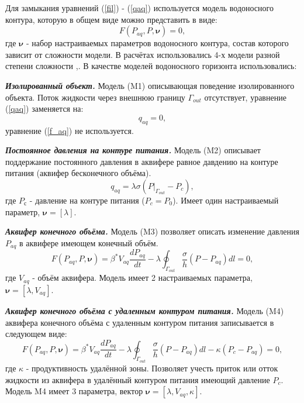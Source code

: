 \documentclass{article}
\begin{document}
Для замыкания уравнений (\ref{fil}) - (\ref{qaq}) используется модель водоносного контура, которую в общем виде можно представить в виде: 
\begin{equation} \label{f_aq}
F(P_{aq}, P,\boldsymbol{\nu})=0,
\end{equation}
где $\boldsymbol{\nu}$ - набор настраиваемых параметров водоносного контура, состав которого зависит от сложности модели. В расчётах использовались 4-х модели разной степени сложности \cite{dake},\cite{fet}. В качестве моделей водоносного горизонта использовались:

\textbf{\textit{Изолированный объект.}}
Модель (M1) описывающая поведение изолированного объекта. Поток жидкости через внешнюю границу $\Gamma_{out}$ отсутствует, уравнение (\ref{qaq}) заменяется на:
\begin{equation}
q_{aq}=0,
\end{equation}
уравнение (\ref{f_aq}) не используется.

\textbf{\textit{Постоянное давления на контуре питания.}}
Модель (M2) описывает поддержание постоянного давления в аквифере равное давдению на контуре питания (аквифер бесконечного объёма). 
\begin{equation}
q_{aq} = \lambda\sigma(P|_{\Gamma_{out}}-P_c),
\end{equation}
где $P_с$ - давление на контуре питания ($P_c = P_0$). Имеет один настраиваемый параметр, $\boldsymbol{\nu} = [\lambda]$.

\textbf{\textit{Аквифер конечного объёма.}}
Модель (M3) позволяет описать изменение давления $P_{aq}$ в аквифере имеющем конечный объём. 
\begin{equation}
F(P_{aq}, P,\boldsymbol{\nu})=\beta^*V_{aq}\frac{dP_{aq}}{dt} - \lambda\oint_{\Gamma_{out}}\frac{\sigma}{h}(P-P_{aq})dl = 0,
\end{equation}
где $V_{aq}$ - объём аквифера. Модель имеет 2 настраиваемых параметра, $\boldsymbol{\nu} = [\lambda, V_{aq}]$.

\textbf{\textit{Аквифер конечного объёма с удаленным контуром питания.}}
Модель (M4) аквифера конечного объёма с удаленным контуром питания записывается в следующем виде: 
\begin{equation}
F(P_{aq}, P,\boldsymbol{\nu})=\beta^*V_{aq}\frac{dP_{aq}}{dt} -\lambda\oint_{\Gamma_{out}}\frac{\sigma}{h}(P-P_{aq})dl - \kappa(P_c - P_{aq})=0,
\end{equation}
где $\kappa$ - продуктивность удалённой зоны. Позволяет учесть приток или отток жидкости из аквифера в удалённый контуром питания имеющий давление $P_{c}$. Модель M4 имеет 3 параметра, вектор $\boldsymbol{\nu} = [\lambda, V_{aq}, \kappa]$.
\end{document}
